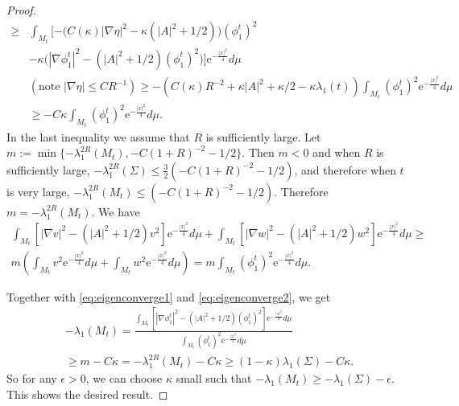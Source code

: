 \documentclass[10pt,a4paper]{amsart}
\begin{document}
\begin{proof}
\begin{equation}
			\begin{split}
				\geq &
				\int_{M_t}[-\big(C(\kappa)|\nabla\eta|^2-\kappa(|A|^{2}+1/2)\big)(\phi_1^t)^2
				\\
				&-\kappa\big(|\nabla \phi_1^t|^2-(|A|^2+1/2)(\phi_1^t)^2\big)] \mathrm{e}^{-\frac{|x|^2}{4}}d\mu\\
				&(\text{note $|\nabla \eta|\leq CR^{-1}$})\geq 
				-(C(\kappa)R^{-2}+\kappa|A|^2+\kappa/2-\kappa\lambda_1(t))
				\int_{M_t}(\phi_1^t)^2\mathrm{e}^{-\frac{|x|^2}{4}}d\mu 
				\\
				&\geq 
				-C\kappa\int_{M_t}(\phi_1^t)^2\mathrm{e}^{-\frac{|x|^2}{4}}d\mu.
			\end{split}
		\end{equation}
		In the last inequality we assume that $R$ is sufficiently large.
		Let 
		$
		m:=\min\{-\lambda_1^{2R}(M_t),-C(1+R)^{-2}-1/2\}.
		$
		Then $m<0$ and when $R$ is sufficiently large, $-\lambda_1^{2R}(\Sigma)\leq\frac{3}{2}( -C(1+R)^{-2}-1/2)$, and therefore when $t$ is very large, $-\lambda_1^{2R}(M_t)\leq( -C(1+R)^{-2}-1/2)$. Therefore $m=-\lambda_1^{2R}(M_t)$. We have
		\begin{multline}\label{eq:eigenconverge2}
			\int_{M_t}[|\nabla v|^2 -(|A|^2+1/2)v^2]\mathrm{e}^{-\frac{|x|^2}{4}}d\mu
			+
			\int_{M_t}[|\nabla w|^2 -(|A|^2+1/2)w^2]\mathrm{e}^{-\frac{|x|^2}{4}}d\mu
			\geq
			\\ m\left(\int_{M_t}v^2\mathrm{e}^{-\frac{|x|^2}{4}}d\mu
			+
			\int_{M_t}w^2\mathrm{e}^{-\frac{|x|^2}{4}}d\mu
			\right)
			=m\int_{M_t}(\phi_1^t)^2\mathrm{e}^{-\frac{|x|^2}{4}}d\mu.
		\end{multline}
		
		Together with \eqref{eq:eigenconverge1} and \eqref{eq:eigenconverge2}, we get
		\begin{multline*}
			-\lambda_1(M_t)=
			\frac{\int_{M_t}[|\nabla \phi_1^t|^2 -(|A|^2+1/2)(\phi_1^t)^2]\mathrm{e}^{-\frac{|x|^2}{4}}d\mu}
			{\int_{M_t}(\phi_1^t)^2\mathrm{e}^{-\frac{|x|^2}{4}}d\mu}
			\\
			\geq m-C\kappa=-\lambda_1^{2R}(M_t)-C\kappa
			\geq (1-\kappa)\lambda_1(\Sigma)-C\kappa.
		\end{multline*}
		So for any $\epsilon>0$, we can choose $\kappa$ small such that $-\lambda_1(M_t)\geq -\lambda_1(\Sigma)-\epsilon$. This shows the desired result.
	\end{proof}
\end{document}
